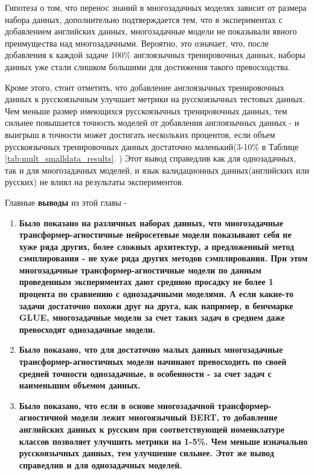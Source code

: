 
Гипотеза о том, что перенос знаний в многозадачных моделях зависит от размера набора данных, дополнительно подтверждается тем, что в экспериментах с добавлением английских данных, многозадачные модели не показывали явного преимущества над многозадачными. Вероятно, это означает, что, после добавления к каждой задаче 100\% англоязычных тренировочных данных, наборы данных уже стали слишком большими для достижения такого превосходства.

Кроме этого, стоит отметить, что добавление англоязычных тренировочных данных к русскоязычным улучшает метрики на русскоязычных тестовых данных. Чем меньше размер имеющихся русскоязычных тренировочных данных, тем сильнее повышается точность моделей от добавления англоязычных данных - и выигрыш в точности может достигать нескольких процентов, если объем русскоязычных тренировочных данных достаточно маленький(3-10\% в Таблице \ref{tab:mult_smalldata_results}. ) Этот вывод справедлив как для однозадачных, так и для многозадачных моделей, и язык валидационных данных(английских или русских) не влиял на результаты экспериментов.

Главные \textbf{выводы} из этой главы -

\begin{enumerate}
  \item \textbf{Было показано на различных наборах данных, что многозадачные трансформер-агностичные нейросетевые модели показывают себя не хуже ряда других, более сложных архитектур, а предложенный метод сэмплирования - не хуже ряда других методов сэмплирования. При этом многозадачные трансформер-агностичные модели по данным проведенным экспериментах дают среднюю просадку не более 1 процента по сравнению с однозадачными моделями. А если какие-то задачи достаточно похожи друг на друга, как например, в бенчмарке GLUE, многозадачные модели за счет таких задач в среднем даже превосходят однозадачные модели.}
  \item \textbf{Было показано, что для достаточно малых данных многозадачные трансформер-агностичных модели начинают превосходить по своей средней точности однозадачные, в особенности - за счет задач с наименьшим объемом данных.}
  \item \textbf{Было показано, что если в основе многозадачной трансформер-агностичной модели лежит многоязычный BERT, то добавление английских данных к русским при соответствующей номенклатуре классов позволяет улучшить метрики на 1-5\%. Чем меньше изначально русскоязычных данных, тем улучшение сильнее. Этот же вывод справедлив и для однозадачных моделей.}
\end{enumerate}
